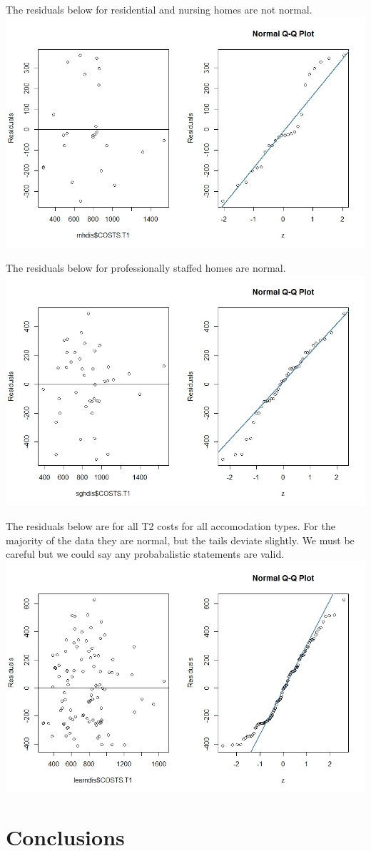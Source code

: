 \documentclass[]{article}
\begin{document}
The residuals below for residential and nursing homes are not normal.
\centering
\includegraphics[width=\textwidth]{RStudio/jpeg/Res_RNH.jpeg}
\raggedright

The residuals below for professionally staffed homes are normal.
\centering
\includegraphics[width=\textwidth]{RStudio/jpeg/Res_SGH.jpeg}
\raggedright

The residuals below are for all T2 costs for all accomodation types. For the majority of the data they are normal, but the tails deviate slightly. We must be careful but we could say any probabalistic statements are valid.
\centering
\includegraphics[width=\textwidth]{RStudio/jpeg/Res_COST.jpeg}
\raggedright

\section{Conclusions}
\end{document}
